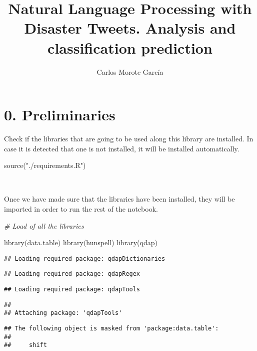 \documentclass[
]{article}
\title{Natural Language Processing with Disaster Tweets. Analysis and
classification prediction}
\author{Carlos Morote García}
\date{}
\newenvironment{Shaded}{\begin{snugshade}}{\end{snugshade}}
\newcommand{\CommentTok}[1]{\textcolor[rgb]{0.56,0.35,0.01}{\textit{#1}}}
\newcommand{\FunctionTok}[1]{\textcolor[rgb]{0.00,0.00,0.00}{#1}}
\newcommand{\NormalTok}[1]{#1}
\newcommand{\StringTok}[1]{\textcolor[rgb]{0.31,0.60,0.02}{#1}}
\begin{document}
\maketitle

\hypertarget{preliminaries}{%
\section{0. Preliminaries}\label{preliminaries}}

Check if the libraries that are going to be used along this library are
installed. In case it is detected that one is not installed, it will be
installed automatically.

\begin{Shaded}
\begin{Highlighting}[]
\FunctionTok{source}\NormalTok{(}\StringTok{"./requirements.R"}\NormalTok{)}
\end{Highlighting}
\end{Shaded}

~

Once we have made sure that the libraries have been installed, they will
be imported in order to run the rest of the notebook.

\begin{Shaded}
\begin{Highlighting}[]
\CommentTok{\# Load of all the libraries}

\FunctionTok{library}\NormalTok{(data.table)}
\FunctionTok{library}\NormalTok{(hunspell)}
\FunctionTok{library}\NormalTok{(qdap)}
\end{Highlighting}
\end{Shaded}

\begin{verbatim}
## Loading required package: qdapDictionaries
\end{verbatim}

\begin{verbatim}
## Loading required package: qdapRegex
\end{verbatim}

\begin{verbatim}
## Loading required package: qdapTools
\end{verbatim}

\begin{verbatim}
## 
## Attaching package: 'qdapTools'
\end{verbatim}

\begin{verbatim}
## The following object is masked from 'package:data.table':
## 
##     shift
\end{verbatim}
\end{document}
